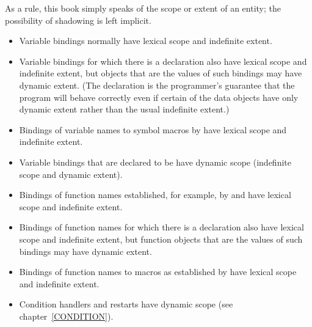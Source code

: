 As a rule, this book simply speaks of the scope or extent of an entity;
the possibility of shadowing is left implicit.
\begin{itemize}
\item
Variable bindings normally have lexical scope and indefinite extent.
\end{itemize}

\begin{newer}
\begin{itemize}
\item Variable bindings for which there is a 
declaration also have lexical scope and indefinite extent,
but objects that are the values of such bindings may have
dynamic extent.
(The declaration is the programmer's guarantee that
the program will behave correctly even if certain of the data objects have only
dynamic extent rather than the usual indefinite extent.)

\item Bindings of variable names to symbol macros by
 have lexical scope and indefinite extent.
\end{itemize}
\end{newer}

\begin{itemize}
\item
Variable bindings that are declared to be  have dynamic scope
(indefinite scope and dynamic extent).
\end{itemize}

\begin{newer}
\begin{itemize}
\item Bindings of function names established, for example, by  and
 have lexical scope and indefinite extent.

\item Bindings of function names for which there is a 
declaration also have lexical scope and indefinite extent,
but function objects that are the values of such bindings may have
dynamic extent.

\item Bindings of function names to macros as established by
 have lexical scope and indefinite extent.

\item Condition handlers and restarts have dynamic scope
(see chapter~\ref{CONDITION}).
\end{itemize}
\end{newer}

